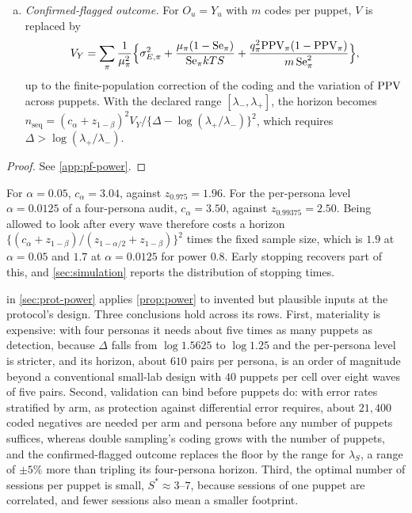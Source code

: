 \begin{proposition}
\begin{enumerate}[(a)]
\[  \]
  does not depend on $n^\ast$. A horizon of $n_{\mathrm{seq}}=(c_\alpha+z_{1-\beta})^2V/\Delta^2$ pairs gives power at least $1-\beta$ by the horizon, to the same approximation, and the expected number of pairs used is smaller because the audit can stop early.
  \item \emph{Confirmed-flagged outcome.} For $O_u=Y_u$ with $m$ codes per puppet, $V$ is replaced by
  \[
    V_Y=\sum_\pi\frac{1}{\mu_\pi^2}\Bigl\{\sigma^2_{E,\pi}+\frac{\mu_\pi(1-\mathrm{Se}_\pi)}{\mathrm{Se}_\pi kTS}+\frac{q_\pi^2\mathrm{PPV}_\pi(1-\mathrm{PPV}_\pi)}{m\,\mathrm{Se}_\pi^2}\Bigr\},
  \]
  up to the finite-population correction of the coding and the variation of $\mathrm{PPV}$ across puppets. With the declared range $[\lambda_-,\lambda_+]$, the horizon becomes $n_{\mathrm{seq}}=(c_\alpha+z_{1-\beta})^2V_Y/\{\Delta-\log(\lambda_+/\lambda_-)\}^2$, which requires $\Delta>\log(\lambda_+/\lambda_-)$.
\end{enumerate}
\end{proposition}

\begin{proof}See \cref{app:pf-power}.\end{proof}

For $\alpha=0.05$, $c_\alpha=3.04$, against $z_{0.975}=1.96$. For the per-persona level $\alpha=0.0125$ of a four-persona audit, $c_\alpha=3.50$, against $z_{0.99375}=2.50$. Being allowed to look after every wave therefore costs a horizon $\{(c_\alpha+z_{1-\beta})/(z_{1-\alpha/2}+z_{1-\beta})\}^2$ times the fixed sample size, which is $1.9$ at $\alpha=0.05$ and $1.7$ at $\alpha=0.0125$ for power $0.8$. Early stopping recovers part of this, and \cref{sec:simulation} reports the distribution of stopping times.

 in \cref{sec:prot-power} applies \cref{prop:power} to invented but plausible inputs at the protocol's design. Three conclusions hold across its rows. First, materiality is expensive: with four personas it needs about five times as many puppets as detection, because $\Delta$ falls from $\log1.5625$ to $\log1.25$ and the per-persona level is stricter, and its horizon, about $610$ pairs per persona, is an order of magnitude beyond a conventional small-lab design with $40$ puppets per cell over eight waves of five pairs. Second, validation can bind before puppets do: with error rates stratified by arm, as protection against differential error requires, about $21{,}400$ coded negatives are needed per arm and persona before any number of puppets suffices, whereas double sampling's coding grows with the number of puppets, and the confirmed-flagged outcome replaces the floor by the range for $\lambda_S$, a range of $\pm5\%$ more than tripling its four-persona horizon. Third, the optimal number of sessions per puppet is small, $S^\ast\approx3$--$7$, because sessions of one puppet are correlated, and fewer sessions also mean a smaller footprint.

